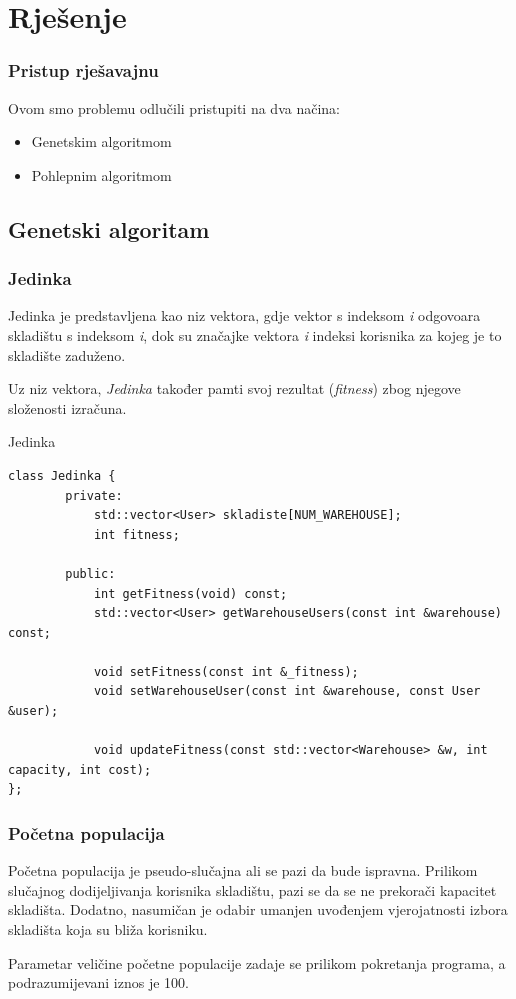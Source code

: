 \documentclass[utf8]{beamer}
\begin{document}
\section{Rješenje}
\begin{frame}
\frametitle{Pristup rješavajnu}

Ovom smo problemu odlučili pristupiti na dva načina:
\vspace{5mm}
\begin{itemize}
	\item Genetskim algoritmom
	\vspace{5mm}
	\item Pohlepnim algoritmom
\end{itemize}

\end{frame}

\subsection{Genetski algoritam}
\begin{frame}
\frametitle{Jedinka}
Jedinka je predstavljena kao niz vektora, gdje vektor s indeksom \textit{i} odgovoara skladištu s indeksom \textit{i}, dok su značajke vektora \textit{i} indeksi korisnika za kojeg je to skladište zaduženo.

\vspace{5mm}

Uz niz vektora, \textit{Jedinka} također pamti svoj rezultat (\textit{fitness}) zbog njegove složenosti izračuna.

\end{frame}

\begin{frame}[fragile]{Jedinka}
\begin{lstlisting}
class Jedinka {
        private:
            std::vector<User> skladiste[NUM_WAREHOUSE];
            int fitness;

        public:
            int getFitness(void) const;
            std::vector<User> getWarehouseUsers(const int &warehouse) const;

            void setFitness(const int &_fitness);
            void setWarehouseUser(const int &warehouse, const User &user);

            void updateFitness(const std::vector<Warehouse> &w, int capacity, int cost);
};
\end{lstlisting}
\end{frame}

\begin{frame}
\frametitle{Početna populacija}

Početna populacija je pseudo-slučajna ali se pazi da bude ispravna. Prilikom slučajnog dodijeljivanja korisnika skladištu, pazi se da se ne prekorači kapacitet skladišta. Dodatno, nasumičan je odabir umanjen uvođenjem vjerojatnosti izbora skladišta koja su bliža korisniku.

\vspace{5mm}

Parametar veličine početne populacije zadaje se prilikom pokretanja programa, a podrazumijevani iznos je 100.

\end{frame}
\end{document}
